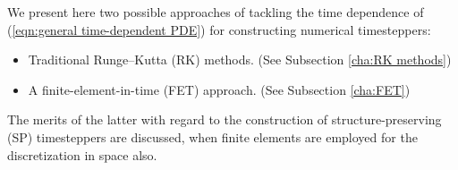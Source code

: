     \line
    
    We present here two possible approaches of tackling the time dependence of (\ref{eqn:general time-dependent PDE}) for constructing numerical timesteppers:
    \begin{itemize}
        \item  Traditional Runge--Kutta (RK) methods. (See Subsection \ref{cha:RK methods})
        \item  A finite-element-in-time (FET) approach. (See Subsection \ref{cha:FET})
    \end{itemize}
    The merits of the latter with regard to the construction of structure-preserving (SP) timesteppers are discussed, when finite elements are employed for the discretization in space also.


    
    

